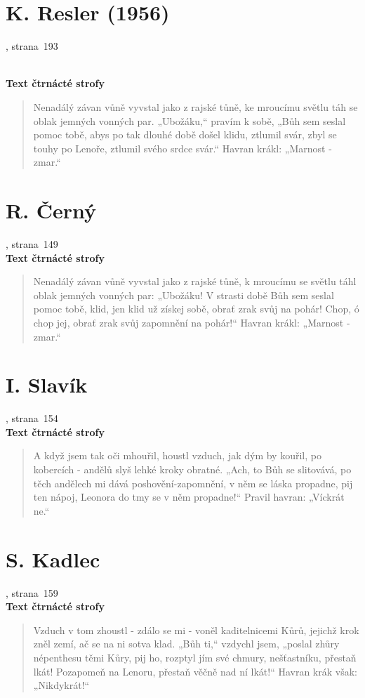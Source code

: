 \documentclass[dp.tex]{subfiles}
\begin{document}
\section*{K. Resler (1956)}
, strana~193
\begin{samepage}
\\\textbf{Text čtrnácté strofy}
\begin{verse}
Nenadálý závan vůně vyvstal jako z rajské tůně,
ke mroucímu světlu táh se oblak jemných vonných par.
„Ubožáku,“ pravím k sobě, „Bůh sem seslal pomoc tobě,
abys po tak dlouhé době došel klidu, ztlumil svár,
zbyl se touhy po Lenoře, ztlumil svého srdce svár.“
Havran krákl: „Marnost - zmar.“
\end{verse}
\end{samepage}

\section*{R. Černý}
, strana~149
\\\textbf{Text čtrnácté strofy}
\begin{verse}
Nenadálý závan vůně vyvstal jako z rajské tůně,
k mroucímu se světlu táhl oblak jemných vonných par:
„Ubožáku! V strasti době Bůh sem seslal pomoc tobě,
klid, jen klid už získej sobě, obrať zrak svůj na pohár!
Chop, ó chop jej, obrať zrak svůj zapomnění na pohár!“
Havran krákl: „Marnost - zmar.“
\end{verse}

\section*{I. Slavík}
, strana~154
\\\textbf{Text čtrnácté strofy}
\begin{samepage}
\begin{verse}
A když jsem tak oči mhouřil, houstl vzduch, jak dým by kouřil,
po kobercích - andělů slyš lehké kroky obratné.
„Ach, to Bůh se slitovává, po těch andělech mi dává
poshovění-zapomnění, v něm se láska propadne,
pij ten nápoj, Leonora do tmy se v něm propadne!“
Pravil havran: „Víckrát ne.“
\end{verse}
\end{samepage}

\section*{S. Kadlec}
, strana~159
\\\textbf{Text čtrnácté strofy}
\begin{verse}
Vzduch v tom zhoustl - zdálo se mi - voněl kaditelnicemi
Kůrů, jejichž krok zněl zemí, ač se na ni sotva klad.
 „Bůh ti,“ vzdychl jsem,  „poslal zhůry népenthesu těmi Kůry,
pij ho, rozptyl jím své chmury, nešťastníku, přestaň lkát!
Pozapomeň na Lenoru, přestaň věčně nad ní lkát!“
Havran krák však: „Nikdykrát!“
\end{verse}
\end{document}

